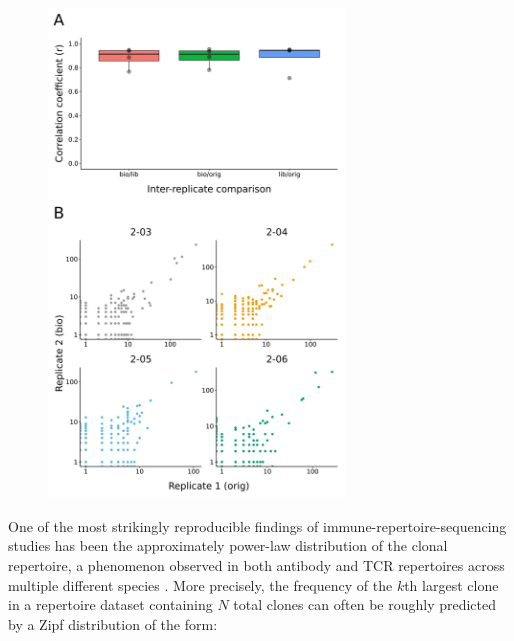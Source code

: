 \begin{figure}
\centering
\includegraphics[width = 0.7\textwidth]{_Figures/png/pilot-clone-sizes-cor}
\begin{subfigure}{0em}
\label{fig:igseq-pilot-clone-sizes-cor-boxplots}
\end{subfigure}
\begin{subfigure}{0em}
\label{fig:igseq-pilot-clone-sizes-cor-scatter}
\end{subfigure}
\label{fig:igseq-pilot-clone-sizes-cor}
\end{figure}

One of the most strikingly reproducible findings of immune-repertoire-sequencing studies has been the approximately power-law distribution of the clonal repertoire, a phenomenon observed in both antibody and TCR repertoires across multiple different species \parencite{desponds2016fluctuating,mora2016diversity}. More precisely, the frequency of the $k$th largest clone in a repertoire dataset containing $N$ total clones can often be roughly predicted by a Zipf distribution \parencite{mora2010mentropy} of the form:

